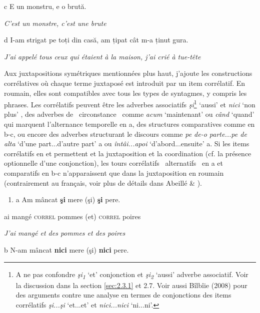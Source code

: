   c  E un monstru, e o brută.

{\itshape
C'est un monstre, c'est une brute}

  d  I-am strigat pe toți din casă, am țipat cât m-a ținut gura. 

    \textit{J'ai appelé tous ceux qui étaient à la maison, j'ai crié à tue-tête}

Aux juxtapositions symétriques mentionnées plus haut, j'ajoute les constructions corrélatives où chaque terme juxtaposé est introduit par un item corrélatif. En roumain, elles sont compatibles avec tous les types de syntagmes, y compris les phrases. Les corrélatifs peuvent être les adverbes associatifs \textit{şi}\footnote{A ne pas confondre \textit{şi}\textit{\textsubscript{1}} `et' conjonction et \textit{şi}\textit{\textsubscript{2}} `aussi' adverbe associatif. Voir la discussion dans la section \ref{sec:2.3.1} et 2.7. Voir aussi Bîlbîie (2008) pour des arguments contre une analyse en termes de conjonctions des items corrélatifs \textit{şi...şi} `et...et' et \textit{nici...nici} `ni...ni'.} `aussi' et \textit{nici} `non plus' , des adverbes de {\guillemotleft}~circonstance~{\guillemotright} comme \textit{acum} `maintenant' ou \textit{când} `quand' qui marquent l'alternance temporelle en a, des structures comparatives comme en b-c, ou encore des adverbes structurant le discours comme \textit{pe de-o parte...pe de alta} `d'une part...d'autre part' a ou \textit{întâi...apoi} `d'abord...ensuite' a. Si les items corrélatifs en  et  permettent et la juxtaposition et la coordination (cf. la présence optionnelle d'une conjonction), les tours corrélatifs {\guillemotleft}~alternatifs~{\guillemotright} en a et comparatifs en b-c n'apparaissent que dans la juxtaposition en roumain (contrairement au français, voir plus de détails dans Abeillé \& \citet{Borsley2006}).


\begin{enumerate}
\item \label{bkm:Ref273695832}a  Am  mâncat  \textbf{şi}  mere  (şi)  \textbf{şi}  pere.


\end{enumerate}
ai  mangé  \textsc{correl}  pommes  (et)  \textsc{correl}  poires

{\itshape
J'ai mangé et des pommes et des poires}

  b  N-am  mâncat  \textbf{nici}  mere  (şi)  \textbf{nici}  pere.

